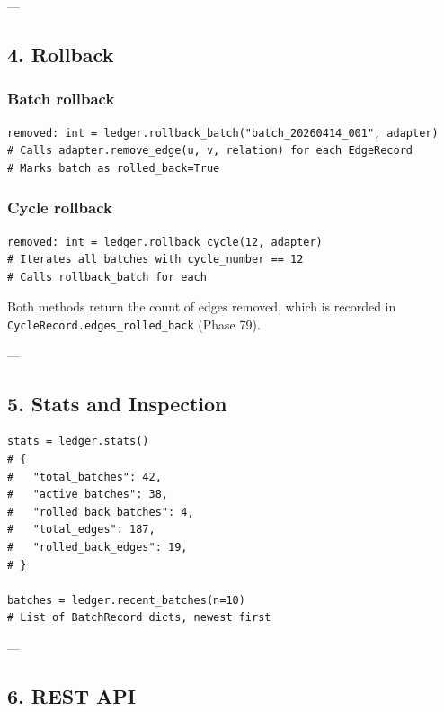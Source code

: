 ---

\subsection{4. Rollback}

\subsubsection{Batch rollback}
\begin{lstlisting}
removed: int = ledger.rollback_batch("batch_20260414_001", adapter)
# Calls adapter.remove_edge(u, v, relation) for each EdgeRecord
# Marks batch as rolled_back=True
\end{lstlisting}

\subsubsection{Cycle rollback}
\begin{lstlisting}
removed: int = ledger.rollback_cycle(12, adapter)
# Iterates all batches with cycle_number == 12
# Calls rollback_batch for each
\end{lstlisting}

Both methods return the count of edges removed, which is recorded in \texttt{CycleRecord.edges\_rolled\_back} (Phase 79).

---

\subsection{5. Stats and Inspection}

\begin{lstlisting}
stats = ledger.stats()
# {
#   "total_batches": 42,
#   "active_batches": 38,
#   "rolled_back_batches": 4,
#   "total_edges": 187,
#   "rolled_back_edges": 19,
# }

batches = ledger.recent_batches(n=10)
# List of BatchRecord dicts, newest first
\end{lstlisting}

---

\subsection{6. REST API}

